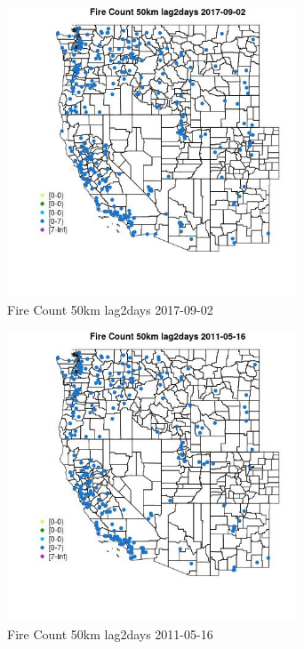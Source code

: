 \begin{figure} 
\centering  
\includegraphics[width=0.77\textwidth]{Code_Outputs/Report_ML_input_PM25_Step4_part_e_de_duplicated_aves_compiled_2019-05-20wNAs_MapObsFire_Count_50km_lag2days2017-09-02.jpg} 
\caption{\label{fig:Report_ML_input_PM25_Step4_part_e_de_duplicated_aves_compiled_2019-05-20wNAsMapObsFire_Count_50km_lag2days2017-09-02}Fire Count 50km lag2days 2017-09-02} 
\end{figure} 
 

\begin{figure} 
\centering  
\includegraphics[width=0.77\textwidth]{Code_Outputs/Report_ML_input_PM25_Step4_part_e_de_duplicated_aves_compiled_2019-05-20wNAs_MapObsFire_Count_50km_lag2days2011-05-16.jpg} 
\caption{\label{fig:Report_ML_input_PM25_Step4_part_e_de_duplicated_aves_compiled_2019-05-20wNAsMapObsFire_Count_50km_lag2days2011-05-16}Fire Count 50km lag2days 2011-05-16} 
\end{figure} 
 

